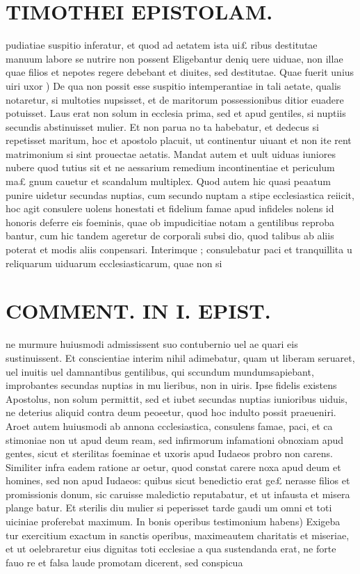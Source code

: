 \documentclass{article}
\begin{document}
\begin{pages}
\section*{TIMOTHEI EPISTOLAM. }
\marginpar{[ p.125 ]}\pstart pudiatiae suspitio inferatur, et quod ad aetatem ista ui£ ribus destitutae manuum labore se nutrire non possent Eligebantur deniq uere uiduae, non illae quae filios et nepotes regere debebant et diuites, sed destitutae.  \pend\pstart Quae fuerit unius uiri uxor ) De qua non possit esse suspitio intemperantiae in tali aetate, qualis notaretur, si multoties nupsisset, et de maritorum possessionibus ditior euadere potuisset. Laus erat non solum in ecclesia prima, sed et apud gentiles, si nuptiis secundis abstinuisset mulier. Et non parua no ta habebatur, et dedecus si repetisset maritum, hoc et apostolo placuit, ut continentur uiuant et non ite rent matrimonium si sint prouectae aetatis. Mandat autem et uult uiduas iuniores nubere quod tutius sit et ne aessarium remedium incontinentiae et periculum ma£ gnum cauetur et scandalum multiplex. Quod autem hic quasi peaatum punire uidetur secundas nuptias, cum secundo nuptam a stipe ecclesiastica reiicit, hoc agit consulere uolens honestati et fidelium famae apud infideles nolens id honoris deferre eis foeminis, quae ob impudicitiae notam a gentilibus reproba bantur, cum hic tandem ageretur de corporali subsi dio, quod talibus ab aliis poterat et modis aliis conpensari. Interimque ; consulebatur paci et tranquillita u reliquarum uiduarum ecclesiasticarum, quae non si  \pend
\section*{COMMENT. IN I. EPIST. }
\marginpar{[ p.126 ]}\pstart ne murmure huiusmodi admississent suo contubernio uel ae quari eis sustinuissent. Et conscientiae interim nihil adimebatur, quam ut liberam seruaret, uel inuitis uel damnantibus gentilibus, qui sccundum mundumsapiebant, improbantes secundas nuptias in mu lieribus, non in uiris. Ipse fidelis existens Apostolus, non solum permittit, sed et iubet secundas nuptias iunioribus uiduis, ne deterius aliquid contra deum peoeetur, quod hoc indulto possit praeueniri. Aroet autem huiusmodi ab annona ccclesiastica, consulens famae, paci, et ca stimoniae non ut apud deum ream, sed infirmorum infamationi obnoxiam apud gentes, sicut et sterilitas foeminae et uxoris apud Iudaeos probro non carens. Similiter infra eadem ratione ar oetur, quod constat carere noxa apud deum et homines, sed non apud Iudaeos: quibus sicut benedictio erat ge£ nerasse filios et promissionis donum, sic caruisse maledictio reputabatur, et ut infausta et misera plange batur. Et sterilis diu mulier si peperisset tarde gaudi um omni et toti uiciniae proferebat maximum.  \pend\pstart In bonis operibus testimonium habens) Exigeba tur exercitium exactum in sanctis operibus, maximeautem charitatis et miseriae, et ut oelebraretur eius dignitas toti ecclesiae a qua sustendanda erat, ne forte fauo re et falsa laude promotam dicerent, sed conspicua  \pend

\end{pages}
\end{document}
